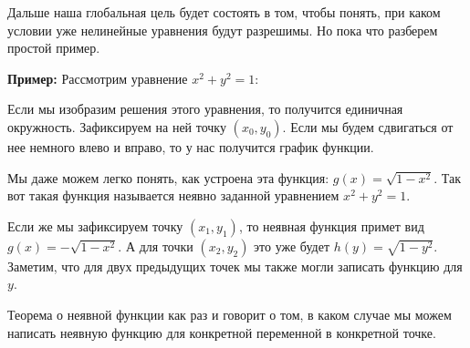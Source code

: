 Дальше наша глобальная цель будет состоять в том, чтобы понять, при каком условии уже нелинейные уравнения будут разрешимы.
Но пока что разберем простой пример.

\vspace*{5mm}

\textbf{Пример:}
Рассмотрим уравнение $x^2 + y^2 = 1$:
\begin{center}
\end{center}
Если мы изобразим решения этого уравнения, то получится единичная окружность.
Зафиксируем на ней точку $(x_0, y_0)$. 
Если мы будем сдвигаться от нее немного влево и вправо, то у нас получится график функции.

Мы даже можем легко понять, как устроена эта функция: $g(x) = \sqrt{1 - x^2}$.
Так вот такая функция называется неявно заданной уравнением $x^2 + y^2 = 1$.

Если же мы зафиксируем точку $(x_1, y_1)$, то неявная функция примет вид $g(x) = -\sqrt{1 - x^2}$. 
А для точки $(x_2, y_2)$ это уже будет $h(y) = \sqrt{1 - y^2}$. 
Заметим, что для двух предыдущих точек мы также могли записать функцию для $y$.

Теорема о неявной функции как раз и говорит о том, в каком случае мы можем написать неявную функцию для конкретной переменной в конкретной точке.
